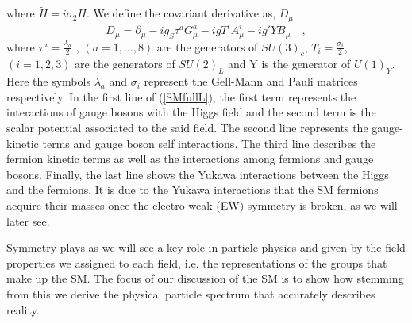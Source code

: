 \documentclass[12pt]{article}
\begin{document}
%
where $\tilde{H}=i\sigma_2 H$. We define the covariant derivative as, $D_\mu$
%
\begin{equation}
D_\mu = \partial_\mu - i g_S \tau^a G^a_\mu - i g T^i A^i_\mu - i g' Y B_\mu \quad ,  
\end{equation}
%
where $\tau^a= \frac{\lambda_a}{2}$ , $(a = 1, . . . , 8)$ are the generators of $SU (3)_c$, $T_i= \frac{\sigma_i}{2} $, $(i = 1, 2, 3)$ are the generators of $SU(2)_L$ and Y is the generator of $U(1)_Y$. Here the symbols $\lambda_a$ and $\sigma_i$ represent the Gell-Mann and Pauli matrices respectively. 
%
%
In the first line of (\ref{SMfullL}), the first term represents the interactions of gauge bosons with the Higgs field and the second term is the scalar potential associated to the said field. 
%
The second line represents the gauge-kinetic terms and gauge boson self interactions. The third line describes the fermion kinetic terms as well as the interactions among fermions and gauge bosons. Finally, the last line shows the Yukawa interactions between the Higgs and the fermions. It is due to the Yukawa interactions that the SM fermions acquire their masses once the electro-weak (EW) symmetry is broken, as we will later see.



Symmetry plays as we will see a key-role in particle physics and given by the field properties we assigned to each field, i.e. the representations of the groups that make up the SM. 
%
The focus of our discussion of the SM is to show how stemming from this we derive the physical particle spectrum that accurately describes reality. 
\end{document}
